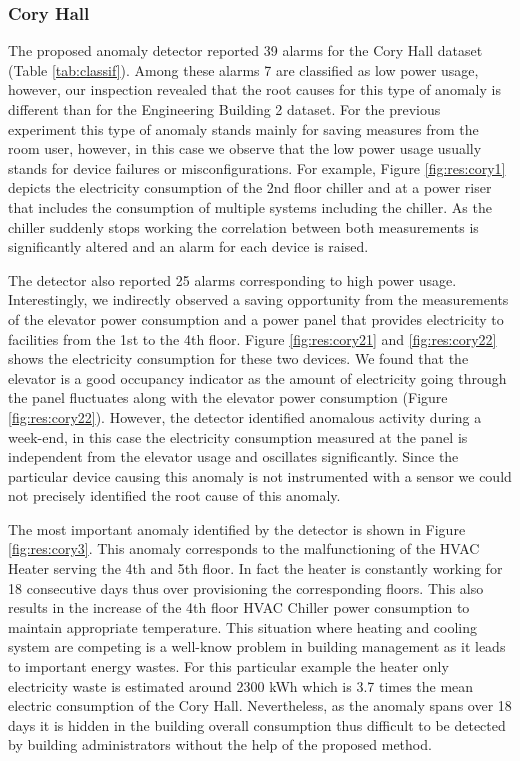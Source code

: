 \subsubsection{Cory Hall}
The proposed anomaly detector reported 39 alarms for the Cory Hall dataset (Table \ref{tab:classif}).
Among these alarms 7 are classified as low power usage, however, our inspection revealed that the root causes for this type of anomaly is different than for the Engineering Building 2 dataset.
For the previous experiment this type of anomaly stands mainly for saving measures from the room user, however, in this case we observe that the low power usage usually stands for device failures or misconfigurations.
For example, Figure \ref{fig:res:cory1} depicts the electricity consumption of the 2nd floor chiller and at a power riser that includes the consumption of multiple systems including the chiller.
As the chiller suddenly stops working the correlation between both measurements is significantly altered and an alarm for each device is raised.

The detector also reported 25 alarms corresponding to high power usage. 
Interestingly, we indirectly observed a saving opportunity from the measurements of the elevator power consumption and a power panel that provides electricity to facilities from the 1st to the 4th floor.
Figure \ref{fig:res:cory21} and \ref{fig:res:cory22} shows the electricity consumption for these two devices. 
We found that the elevator is a good occupancy indicator as the amount of electricity going through the panel fluctuates along with the elevator power consumption (Figure \ref{fig:res:cory22}).
However, the detector identified anomalous activity during a week-end, in this case the electricity consumption measured at the panel is independent from the elevator usage and oscillates significantly.
Since the particular device causing this anomaly is not instrumented with a sensor we could not precisely identified the root cause of this anomaly.

The most important anomaly identified by the detector is shown in Figure \ref{fig:res:cory3}.
This anomaly corresponds to the malfunctioning of the HVAC Heater serving the 4th and 5th floor. 
In fact the heater is constantly working for 18 consecutive days thus over provisioning the corresponding floors.
This also results in the increase of the 4th floor HVAC Chiller power consumption to maintain appropriate temperature.
This situation where heating and cooling system are competing is a well-know problem in building management as it leads to important energy wastes.
For this particular example the heater only electricity waste is estimated around 2300 kWh which is 3.7 times the mean electric consumption of the Cory Hall.
Nevertheless, as the anomaly spans over 18 days it is hidden in the building overall consumption thus difficult to be detected by building administrators without the help of the proposed method.
